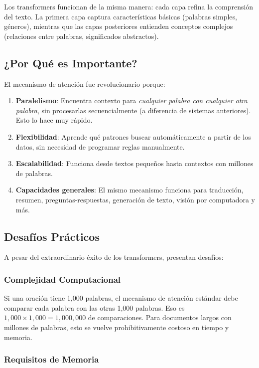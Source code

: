 Los transformers funcionan de la misma manera: cada capa refina la comprensión del texto. La primera capa captura características básicas (palabras simples, géneros), mientras que las capas posteriores entienden conceptos complejos (relaciones entre palabras, significados abstractos).

\subsection{¿Por Qué es Importante?}

El mecanismo de atención fue revolucionario porque:
\begin{enumerate}[leftmargin=*]
    \item \textbf{Paralelismo}: Encuentra contexto para \emph{cualquier palabra con cualquier otra palabra}, sin procesarlas secuencialmente (a diferencia de sistemas anteriores). Esto lo hace muy rápido.
    \item \textbf{Flexibilidad}: Aprende qué patrones buscar automáticamente a partir de los datos, sin necesidad de programar reglas manualmente.
    \item \textbf{Escalabilidad}: Funciona desde textos pequeños hasta contextos con millones de palabras.
    \item \textbf{Capacidades generales}: El mismo mecanismo funciona para traducción, resumen, preguntas-respuestas, generación de texto, visión por computadora y más.
\end{enumerate}

\subsection{Desafíos Prácticos}

A pesar del extraordinario éxito de los transformers, presentan desafíos:

\subsubsection{Complejidad Computacional}

Si una oración tiene 1,000 palabras, el mecanismo de atención estándar debe comparar cada palabra con las otras 1,000 palabras. Eso es $1,000 \times 1,000 = 1,000,000$ de comparaciones. Para documentos largos con millones de palabras, esto se vuelve prohibitivamente costoso en tiempo y memoria.

\subsubsection{Requisitos de Memoria}

